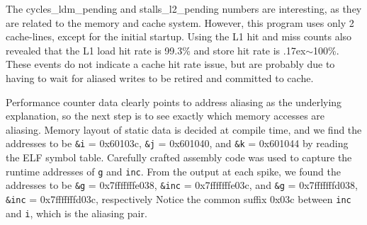 \documentclass[10pt, conference, compsocconf]{IEEEtran}
\begin{document}
The cycles\_ldm\_pending and stalls\_l2\_pending numbers are interesting, as they are related to the memory and cache system.
However, this program uses only 2 cache-lines, except for the initial startup.
Using the L1 hit and miss counts also revealed that the L1 load hit rate is 99.3\% and store hit rate is {\raise.17ex\hbox{$\scriptstyle\mathtt{\sim}$}}100\%.
These events do not indicate a cache hit rate issue, but are probably due to having to wait for aliased writes to be retired and committed to cache.

Performance counter data clearly points to address aliasing as the underlying explanation, so the next step is to see exactly which memory accesses are aliasing.
Memory layout of static data is decided at compile time, and we find the addresses to be \texttt{\&i} = 0x60103c, \texttt{\&j} = 0x601040, and \texttt{\&k} = 0x601044 by reading the ELF symbol table.
Carefully crafted assembly code was used to capture the runtime addresses of \texttt{g} and \texttt{inc}.
From the output at each spike, we found the addresses to be \texttt{\&g} = 0x7fffffffe038, \texttt{\&inc} = 0x7fffffffe03c, and \texttt{\&g} = 0x7fffffffd038, \texttt{\&inc} = 0x7fffffffd03c, respectively
Notice the common suffix 0x03c between \texttt{inc} and \texttt{i}, which is the aliasing pair.


% 
 
\end{document}
